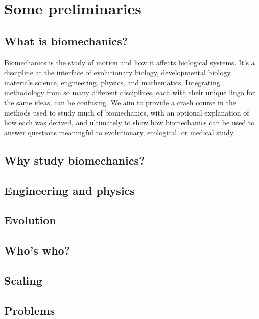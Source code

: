 
\chapter{Some preliminaries}

\section{What is biomechanics?}
Biomechanics is the study of motion and how it affects biological systems. It's a discipline at the interface of evolutionary biology, developmental biology, materials science, engineering, physics, and mathematics. Integrating methodology from so many different disciplines, each with their unique lingo for the same ideas, can be confusing. We aim to provide a crash course in the methods used to study much of biomechanics, with an optional explanation of how each was derived, and ultimately to show how biomechanics can be used to answer questions meaningful to evolutionary, ecological, or medical study.




\section{Why study biomechanics?}
\section{Engineering and physics}
\section{Evolution}
\section{Who's who?}
\section{Scaling}
\section{Problems}


